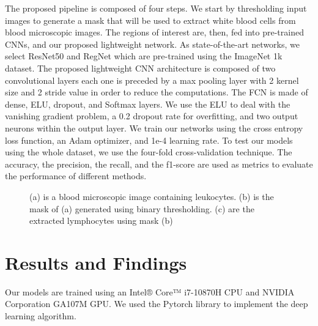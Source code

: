 \documentclass[diagnostics,article,submit,pdftex,moreauthors]{Definitions/mdpi}
\begin{document}
The proposed pipeline is composed of four steps. We start by thresholding input images to generate a mask that will be used to extract white blood cells from blood microscopic images. The regions of interest are, then, fed into pre-trained CNNs, and our proposed lightweight network. As state-of-the-art networks, we select ResNet50 \cite{he2016deep} and RegNet \cite{radosavovic2020designing} which are pre-trained using the ImageNet 1k dataset. The proposed lightweight CNN architecture is composed of two convolutional layers each one is preceded by a max pooling layer with 2 kernel size and 2 stride value in order to reduce the computations. The FCN is made of dense, ELU, dropout, and Softmax layers. We use the ELU to deal with the vanishing gradient problem, a 0.2 dropout rate for overfitting, and two output neurons within the output layer. 
We train our networks using the cross entropy loss function, an Adam optimizer, and 1e-4 learning rate. 
To test our models using the whole dataset, we use the four-fold cross-validation technique. The accuracy, the precision, the recall, and the f1-score are used as metrics to evaluate the performance of different methods.
\begin{figure}[!h]
  \centering
  \quad 
  \quad 
  \quad  
  \caption{(a) is a blood microscopic image containing leukocytes. (b) is the mask of (a) generated using binary thresholding. (c) are the extracted lymphocytes using mask (b)}
\end{figure}

\section{Results and Findings}
Our models are trained using an Intel® Core™ i7-10870H CPU and NVIDIA Corporation GA107M GPU. We used the Pytorch library to implement the deep learning algorithm.
\end{document}
